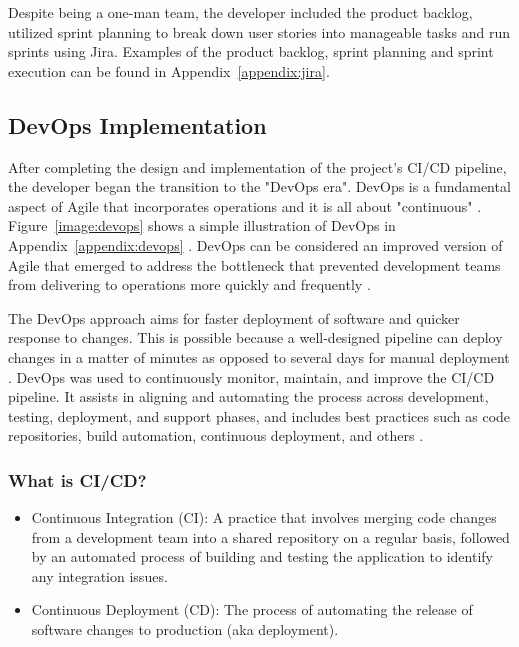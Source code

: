 Despite being a one-man team, the developer included the product backlog, utilized sprint planning to break down user stories into manageable tasks and run sprints using Jira. Examples of the product backlog, sprint planning and sprint execution can be found in Appendix~\ref{appendix:jira}.

\subsection{DevOps Implementation}
After completing the design and implementation of the project's CI/CD pipeline, the developer began the transition to the "DevOps era". DevOps is a fundamental aspect of Agile that incorporates operations and it is all about "continuous" \cite{vsd, mitesh}. Figure~\ref{image:devops} shows a simple illustration of DevOps in Appendix~\ref{appendix:devops} \cite{os}. DevOps can be considered an improved version of Agile that emerged to address the bottleneck that prevented development teams from delivering to operations more quickly and frequently \cite{hlrf}.

The DevOps approach aims for faster deployment of software and quicker response to changes. This is possible because a well-designed pipeline can deploy changes in a matter of minutes as opposed to several days for manual deployment \cite{joakim, khdwf}. DevOps was used to continuously monitor, maintain, and improve the CI/CD pipeline. It assists in aligning and automating the process across development, testing, deployment, and support phases, and includes best practices such as code repositories, build automation, continuous deployment, and others \cite{spj}. 

\subsubsection{What is CI/CD? \cite{sander, nikhil}}

\begin{itemize}
\item Continuous Integration (CI): A practice that involves merging code changes from a development team into a shared repository on a regular basis, followed by an automated process of building and testing the application to identify any integration issues.
\item Continuous Deployment (CD): The process of automating the release of software changes to production (aka deployment).
\end{itemize}

